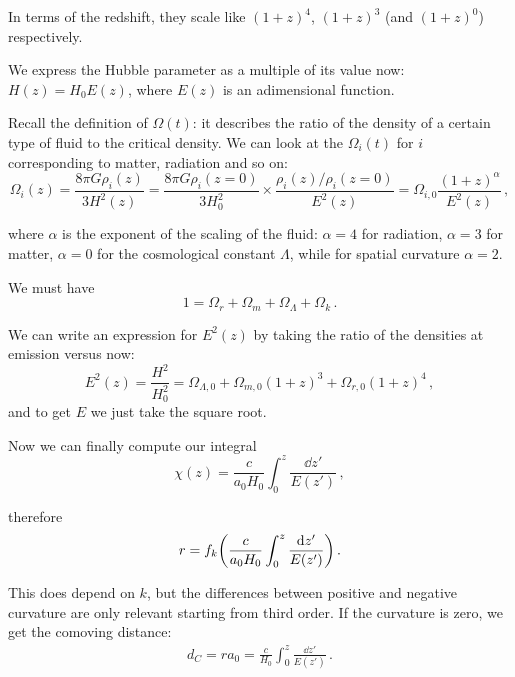 \documentclass[main.tex]{subfiles}
\begin{document}
In terms of the redshift, they scale like \((1+z)^{4}\), \((1+z)^{3}\) (and \((1+z)^{0}\)) respectively.

We express the Hubble parameter as a multiple of its value now: \(H(z) = H_0 E(z)\), where \(E(z)\) is an adimensional function.

Recall the definition of \(\Omega (t)\): it describes the ratio of the density of a certain type of fluid to the critical density. We can look at the \(\Omega_i (t)\) for \(i\) corresponding to matter, radiation and so on: 
%
\begin{equation}
  \Omega _i (z) = \frac{8 \pi G \rho _i (z)}{3 H^2(z)}
  = \frac{8 \pi G \rho_{i}(z=0)}{3 H_0 ^2} \times  \frac{\rho _i (z) / \rho_{i}(z=0)}{E^2(z)}
  = \Omega _{i,0} \frac{(1+z)^{\alpha }}{E^2(z)}
\,,
\end{equation}

where \(\alpha \) is the exponent of the scaling of the fluid: \(\alpha = 4\) for radiation, \(\alpha = 3\) for matter, \(\alpha = 0\) for the cosmological constant \(\Lambda \), while for spatial curvature \(\alpha = 2\).


We must have 
%
\begin{equation}
  1 = \Omega _r + \Omega _m + \Omega _\Lambda + \Omega _k
\,.
\end{equation}

We can write an expression for \(E^2(z)\) by taking the ratio of the densities at emission versus now:
%
\begin{equation}
  E^2(z) = \frac{H^2}{H_0^2} = 
  \Omega _{\Lambda , 0} +  \Omega_{m, 0} (1+z)^{3}
  +\Omega_{r, 0} (1+z)^4
\,,
\end{equation}
%
and to get \(E\) we just take the square root.

Now we can finally compute our integral 
%
\begin{equation}
  \chi (z) = \frac{c}{a_0 H_0 } \int_{0}^{z} \frac{\dd{z'} }{E(z')}
\,,
\end{equation}
%

therefore 
%
\begin{equation}
  r = f_k \qty(\frac{c}{a_0 H_0 } \int_0^z \frac{\dd{z'}   }{E(z')})
\,.
\end{equation}
%

This does depend on \(k\), but the differences between positive and negative curvature are only relevant starting from third order.
If the curvature is zero, we get the comoving distance:
%
\begin{align}
d_C = r a_0 = \frac{c}{H_0 } \int_{0}^{z} \frac{ \dd{z'}}{E(z')}
\,.
\end{align}
\end{document}

